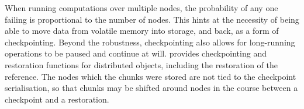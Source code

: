 When running computations over multiple nodes, the probability of any one failing is proportional to the number of nodes.
This hints at the necessity of being able to move data from volatile memory into storage, and back, as a form of checkpointing.
Beyond the robustness, checkpointing also allows for long-running operations to be paused and continue at will.
\lsr provides checkpointing and restoration functions for distributed objects, including the restoration of the reference.
The nodes which the chunks were stored are not tied to the checkpoint serialisation, so that chunks may be shifted around nodes in the course between a checkpoint and a restoration.
